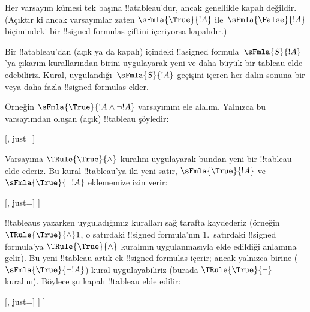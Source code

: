\begin{ex}
  Her varsayım kümesi tek başına !!a{tableau}'dur, ancak genellikle kapalı
  değildir. (Açıktır ki ancak varsayımlar zaten
  $\sFmla{\True}{!A}$ ile~$\sFmla{\False}{!A}$ biçimindeki bir
  !!{signed formula}s çiftini içeriyorsa kapalıdır.)

  Bir !!a{tableau}'dan (açık ya da kapalı) içindeki
  !!a{signed formula}~$\sFmla{S}{!A}$'ya
  çıkarım kurallarından birini uygulayarak yeni ve daha büyük bir tableau
  elde edebiliriz. Kural, uygulandığı~$\sFmla{S}{!A}$ geçişini içeren her dalın sonuna
  bir veya daha fazla !!{signed formula}s ekler.

  Örneğin $\sFmla{\True}{!A \land \lnot !A}$ varsayımını ele alalım.
  Yalnızca bu varsayımdan oluşan (açık) !!{tableau} şöyledir:
  \begin{center}
    \begin{tableau}{}
      [, just=\TAss]
    \end{tableau}{}
  \end{center}
  Varsayıma $\TRule{\True}{\land}$ kuralını uygulayarak bundan yeni bir
  !!{tableau} elde ederiz. Bu kural !!{tableau}'ya iki yeni satır,
  $\sFmla{\True}{!A}$ ve $\sFmla{\True}{\lnot !A}$ eklememize izin verir:
  \begin{center}
    \begin{tableau}{}
      [, just=\TAss
        [\sFmla{\True}{\formula{A}}, just={\TRule{\True}{\land}[1]},
          [\sFmla{\True}{\lnot \formula{A}}, just={\TRule{\True}{\land}[1]}
          ]
        ]
      ]
    \end{tableau}{}
  \end{center}
  !!{tableau}s yazarken uyguladığımız kuralları sağ tarafta kaydederiz
  (örneğin $\TRule{\True}{\land} 1$, o satırdaki !!{signed formula}'nın
  $1$.~satırdaki !!{signed formula}'ya $\TRule{\True}{\land}$ kuralının
  uygulanmasıyla elde edildiği anlamına gelir). Bu yeni !!{tableau} artık
  ek !!{signed formula}s içerir; ancak yalnızca birine
  ($\sFmla{\True}{\lnot !A}$) kural uygulayabiliriz (burada
  $\TRule{\True}{\lnot}$ kuralını). Böylece şu kapalı !!{tableau} elde edilir:
  \begin{center}
    \begin{tableau}{}
      [, just=\TAss
        [\sFmla{\True}{\formula{A}}, just={\TRule{\True}{\land}[1]}
          [\sFmla{\True}{\lnot \formula{A}}, just={\TRule{\True}{\land}[1]}
            [\sFmla{\False}{\formula{A}}, just={\TRule{\True}{\lnot}[3]}, close]
          ]
        ]
      ]
    \end{tableau}{}
  \end{center}
\end{ex}

